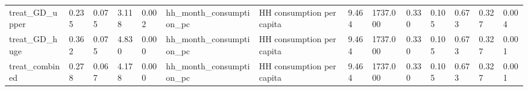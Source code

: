 \begin{tabular}{llllllllllllll}
treat\_GD\_upper & 0.235 & 0.075 & 3.118 & 0.002 & hh\_month\_consumption\_pc & HH consumption per capita & 9.464 & 1737.000 & 0.330 & 0.105 & 0.673 & 0.327 & 0.004 \\
treat\_GD\_huge & 0.362 & 0.075 & 4.830 & 0.000 & hh\_month\_consumption\_pc & HH consumption per capita & 9.464 & 1737.000 & 0.330 & 0.105 & 0.673 & 0.327 & 0.001 \\
treat\_combined & 0.278 & 0.067 & 4.178 & 0.000 & hh\_month\_consumption\_pc & HH consumption per capita & 9.464 & 1737.000 & 0.330 & 0.105 & 0.673 & 0.327 & 0.001 \\
\bottomrule
\end{tabular}
